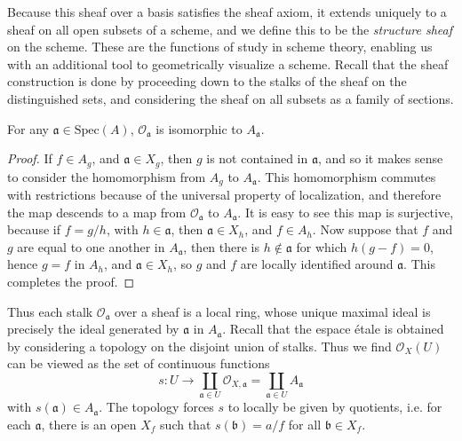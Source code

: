Because this sheaf over a basis satisfies the sheaf axiom, it extends uniquely to a sheaf on all open subsets of a scheme, and we define this to be the {\it structure sheaf} on the scheme. These are the functions of study in scheme theory, enabling us with an additional tool to geometrically visualize a scheme. Recall that the sheaf construction is done by proceeding down to the stalks of the sheaf on the distinguished sets, and considering the sheaf on all subsets as a family of sections.

\begin{theorem}
    For any $\mathfrak{a} \in \text{Spec}(A)$, $\mathcal{O}_{\mathfrak{a}}$ is isomorphic to $A_{\mathfrak{a}}$.
\end{theorem}
\begin{proof}
    If $f \in A_g$, and $\mathfrak{a} \in X_g$, then $g$ is not contained in $\mathfrak{a}$, and so it makes sense to consider the homomorphism from $A_g$ to $A_{\mathfrak{a}}$. This homomorphism commutes with restrictions because of the universal property of localization, and therefore the map descends to a map from $\mathcal{O}_{\mathfrak{a}}$ to $A_{\mathfrak{a}}$. It is easy to see this map is surjective, because if $f = g/h$, with $h \in \mathfrak{a}$, then $\mathfrak{a} \in X_h$, and $f \in A_h$. Now suppose that $f$ and $g$ are equal to one another in $A_{\mathfrak{a}}$, then there is $h \not \in \mathfrak{a}$ for which $h(g - f) = 0$, hence $g = f$ in $A_h$, and $\mathfrak{a} \in X_h$, so $g$ and $f$ are locally identified around $\mathfrak{a}$. This completes the proof.
\end{proof}

Thus each stalk $\mathcal{O}_{\mathfrak{a}}$ over a sheaf is a local ring, whose unique maximal ideal is precisely the ideal generated by $\mathfrak{a}$ in $A_{\mathfrak{a}}$. Recall that the espace \'{e}tale is obtained by considering a topology on the disjoint union of stalks. Thus we find $\mathcal{O}_X(U)$ can be viewed as the set of continuous functions
%
\[ s: U \to \coprod_{\mathfrak{a} \in U} \mathcal{O}_{X,\mathfrak{a}} = \coprod_{\mathfrak{a} \in U} A_{\mathfrak{a}} \]
%
with $s(\mathfrak{a}) \in A_{\mathfrak{a}}$. The topology forces $s$ to locally be given by quotients, i.e. for each $\mathfrak{a}$, there is an open $X_f$ such that $s(\mathfrak{b}) = a/f$ for all $\mathfrak{b} \in X_f$.

